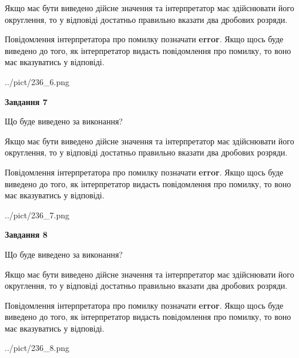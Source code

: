 \documentclass[12pt, ukrainian]{article}
\begin{document}
{\begin {Large}
Якщо має бути виведено дійсне значення та інтерпретатор має здійснювати його округлення, 
то у відповіді достатньо правильно вказати два дробових розряди.

Повідомлення інтерпретатора про помилку позначати \textbf{error}.
Якщо щось буде виведено до того, як інтерпретатор видасть повідомлення про помилку, 
то воно має вказуватись у відповіді. \par

\begin{center}
	{../pict/236_6.png}
\end{center}
\newpage

{\begin {center}\textbf{Завдання 7}\end {center}}\par
Що буде виведено за виконання? \par

Якщо має бути виведено дійсне значення та інтерпретатор має здійснювати його округлення, 
то у відповіді достатньо правильно вказати два дробових розряди.

Повідомлення інтерпретатора про помилку позначати \textbf{error}.
Якщо щось буде виведено до того, як інтерпретатор видасть повідомлення про помилку, 
то воно має вказуватись у відповіді. \par

\begin{center}
	{../pict/236_7.png}
\end{center}
\newpage

{\begin {center}\textbf{Завдання 8}\end {center}}\par
Що буде виведено за виконання? \par

Якщо має бути виведено дійсне значення та інтерпретатор має здійснювати його округлення, 
то у відповіді достатньо правильно вказати два дробових розряди.

Повідомлення інтерпретатора про помилку позначати \textbf{error}.
Якщо щось буде виведено до того, як інтерпретатор видасть повідомлення про помилку, 
то воно має вказуватись у відповіді. \par

\begin{center}
	{../pict/236_8.png}
\end{center}
\newpage


\end{Large}}
\end{document}
